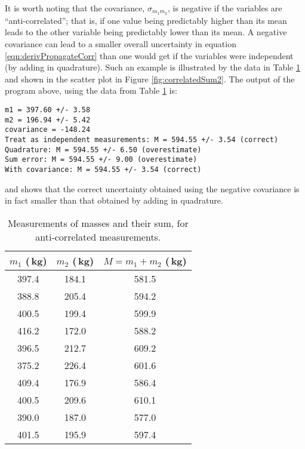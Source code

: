 It is worth noting that the covariance, $\sigma_{m_1m_2}$, is negative if the variables are ``anti-correlated''; that is, if one value being predictably higher than its mean leads to the other variable being predictably lower than its mean. A negative covariance can lead to a smaller overall uncertainty in equation \ref{eqn:derivPropagateCorr} than one would get if the variables were independent (by adding in quadrature). Such an example is illustrated by the data in Table \ref{tab:massSum2} and shown in the scatter plot in Figure \ref{fig:correlatedSum2}. The output of the program above, using the data from Table \ref{tab:massSum2} is:
\begin{verbatim}
m1 = 397.60 +/- 3.58
m2 = 196.94 +/- 5.42
covariance = -148.24
Treat as independent measurements: M = 594.55 +/- 3.54 (correct)
Quadrature: M = 594.55 +/- 6.50 (overestimate)
Sum error: M = 594.55 +/- 9.00 (overestimate)
With covariance: M = 594.55 +/- 3.54 (correct)
\end{verbatim}
and shows that the correct uncertainty obtained using the negative covariance is in fact smaller than that obtained by adding in quadrature.

\begin{table}[h!]
\center
\begin{tabular}{ |c|c|c| }
  \hline
  \textbf{$m_1$ (\,kg)} & \textbf{$m_2$ (\,kg)} & \textbf{$M=m_1+m_2$ (\,kg)}\\
  \hline
397.4 & 184.1 & 581.5\\ 
 \hline
388.8 & 205.4 & 594.2\\ 
 \hline
400.5 & 199.4 & 599.9\\ 
 \hline
416.2 & 172.0 & 588.2\\ 
 \hline
396.5 & 212.7 & 609.2\\ 
 \hline
375.2 & 226.4 & 601.6\\ 
 \hline
409.4 & 176.9 & 586.4\\ 
 \hline
400.5 & 209.6 & 610.1\\ 
 \hline
390.0 & 187.0 & 577.0\\ 
 \hline
401.5 & 195.9 & 597.4\\ 
 \hline
\end{tabular}
\caption{\label{tab:massSum2}Measurements of masses and their sum, for anti-correlated measurements.}
\end{table}


